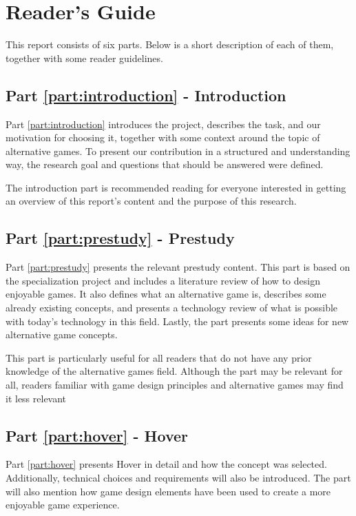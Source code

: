 \section{Reader's Guide}
\label{chap:readers_guide}
This report consists of six parts. Below is a short description of each of them, together with some reader guidelines.

\subsection*{Part \ref{part:introduction} - Introduction}
Part \ref{part:introduction} introduces the project, describes the task, and our motivation for choosing it, together with some context around the topic of alternative games. To present our contribution in a structured and understanding way, the research goal and questions that should be answered were defined.

The introduction part is recommended reading for everyone interested in getting an overview of this report’s content and the purpose of this research.

\subsection*{Part \ref{part:prestudy} - Prestudy}
Part \ref{part:prestudy} presents the relevant prestudy content. This part is based on the specialization project and includes a literature review of how to design enjoyable games. It also defines what an alternative game is, describes some already existing concepts, and presents a technology review of what is possible with today’s technology in this field. Lastly, the part presents some ideas for new alternative game concepts.

This part is particularly useful for all readers that do not have any prior knowledge of the alternative games field. Although the part may be relevant for all, readers familiar with game design principles and alternative games may find it less relevant

\subsection*{Part \ref{part:hover} - Hover}
Part \ref{part:hover} presents Hover in detail and how the concept was selected. Additionally, technical choices and requirements will also be introduced. The part will also mention how game design elements have been used to create a more enjoyable game experience.

